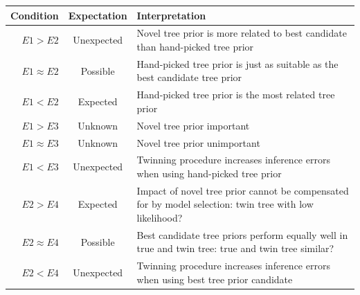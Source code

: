 \documentclass{article}
\begin{document}
\begin{table}
  \begin{tabular}{ | r | c | p{9cm} | }
    \hline
    \textbf{Condition} & \textbf{Expectation} & \textbf{Interpretation} \\ 
    \hline
    \textbf{$E1 > E2$}       & Unexpected & Novel tree prior is more related to 
      best candidate than hand-picked tree prior \\
    \textbf{$E1 \approx E2$} & Possible   & Hand-picked tree prior is just as 
      suitable as the best candidate tree prior \\
    \textbf{$E1 < E2$}       & Expected   & Hand-picked tree prior is the most 
      related tree prior \\
    \hline
    \textbf{$E1 > E3$}       & Unknown    & Novel tree prior important \\
    \textbf{$E1 \approx E3$} & Unknown    & Novel tree prior unimportant \\
    \textbf{$E1 < E3$}       & Unexpected & Twinning procedure increases 
      inference errors when using hand-picked tree prior \\
    \hline
    \textbf{$E2 > E4$}       & Expected   & Impact of novel tree prior cannot 
      be compensated for by model selection: twin tree with low likelihood? \\
    \textbf{$E2 \approx E4$} & Possible   & Best candidate tree priors perform 
      equally well in true and twin tree: true and twin tree similar? \\
    \textbf{$E2 < E4$}       & Unexpected & Twinning procedure increases 
      inference errors  when using best tree prior candidate \\

\end{tabular}
\end{table}
\end{document}
